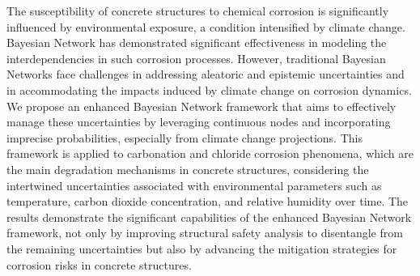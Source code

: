 The susceptibility of concrete structures to chemical corrosion is significantly influenced by environmental exposure, a condition intensified by climate change. 
Bayesian Network has demonstrated significant effectiveness in modeling the interdependencies in such corrosion processes. However, traditional Bayesian Networks face challenges in addressing aleatoric and epistemic uncertainties and in accommodating the impacts induced by climate change on corrosion dynamics. We propose an enhanced Bayesian Network framework that aims to effectively manage these uncertainties by leveraging continuous nodes and incorporating imprecise probabilities, especially from climate change projections. This framework is applied to carbonation and chloride corrosion phenomena, which are the main degradation mechanisms in concrete structures, considering the intertwined uncertainties associated with environmental parameters such as temperature, carbon dioxide concentration, and relative humidity over time. The results demonstrate the significant capabilities of the enhanced Bayesian Network framework, not only by improving structural safety analysis to disentangle from the remaining uncertainties but also by advancing the mitigation strategies for corrosion risks in concrete structures.
